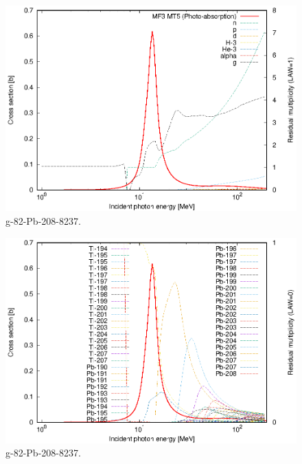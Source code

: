 \begin{figure}
 \includegraphics[width=\linewidth]{eps/g_82-Pb-208_8237.eps}
  \caption{g-82-Pb-208-8237.}
\end{figure}
\begin{figure}
 \includegraphics[width=\linewidth]{eps-law0/g_82-Pb-208_8237.eps}
 \caption{g-82-Pb-208-8237.}
\end{figure}
\newpage \clearpage

